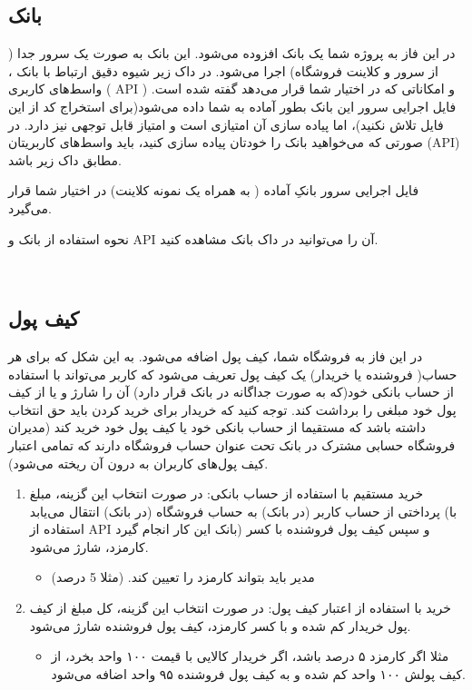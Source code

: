 \documentclass[]{article}
\begin{document}
\subsection*{{\titr بانک}}

در این فاز به پروژه شما یک بانک افزوده می‌شود. این بانک به صورت یک سرور جدا ( از سرور و کلاینت فروشگاه‌) اجرا می‌شود. در داک زیر شیوه دقیق ارتباط با بانک ، واسط‌های کاربری  ( API )‌ و امکاناتی که در اختیار شما قرار می‌دهد گفته شده است. فایل اجرایی سرور این بانک بطور آماده به شما داده می‌شود(برای استخراج کد از این فایل تلاش نکنید)، اما پیاده سازی آن امتیازی است و امتیاز قابل توجهی نیز دارد. در صورتی که می‌خواهید بانک را خودتان پیاده سازی کنید، باید واسط‌های کاربریتان (API)‌ مطابق داک زیر باشد.

فایل اجرایی سرور بانکِ آماده ( به همراه یک نمونه کلاینت) در اختیار شما قرار می‌گیرد.

نحوه استفاده از بانک و API آن را می‌توانید در \textcolor{CustomColor}{داک بانک} مشاهده کنید.

\newpage


 \Large \textbf{\\
}
\subsection*{{\titr کیف پول}}
در این فاز به \textcolor{CustomColor}{فروشگاه} شما، کیف پول اضافه می‌شود. به این شکل که برای هر حساب( فروشنده یا خریدار) یک کیف پول تعریف می‌شود که کاربر می‌تواند با استفاده از حساب بانکی خود(که به صورت جداگانه در بانک قرار دارد) آن را شارژ و یا از کیف پول خود مبلغی را برداشت کند. توجه کنید که خریدار برای خرید کردن باید حق انتخاب داشته باشد که مستقیما از حساب بانکی خود یا کیف پول خود خرید کند (مدیران فروشگاه حسابی مشترک در بانک تحت عنوان حساب فروشگاه دارند که تمامی اعتبار کیف پول‌های کاربران به درون آن ریخته می‌شود).


\begin{enumerate}

\item
خرید مستقیم با  استفاده از حساب بانکی: در صورت انتخاب این گزینه، مبلغ پرداختی از حساب کاربر (در بانک) به حساب فروشگاه (در بانک) انتقال می‌یابد (با استفاده از API بانک این کار انجام گیرد) و سپس کیف پول فروشنده با کسر کارمزد، شارژ‌ می‌شود.

\begin{itemize}[label=$\blacksquare$]
\item
مدیر باید بتواند کارمزد را تعیین کند. (مثلا 5 درصد)
\end{itemize}


\item
خرید با استفاده از اعتبار کیف پول:‌ در صورت انتخاب این گزینه، کل مبلغ از کیف پول خریدار کم شده و با کسر کارمزد، کیف پول فروشنده شارژ می‌شود.

\begin{itemize}[label=$\blacksquare$]
\item
مثلا اگر کارمزد ۵ درصد باشد، اگر خریدار کالایی با قیمت ۱۰۰ واحد بخرد، از کیف پولش ۱۰۰ واحد کم شده و به کیف پول فروشنده ۹۵ واحد اضافه می‌شود.
\end{itemize}

\end{enumerate}
\end{document}
